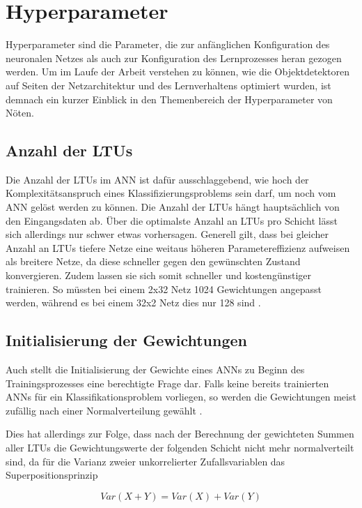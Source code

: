 \section{Hyperparameter} \label{hyperparam}

Hyperparameter sind die Parameter, die zur anfänglichen Konfiguration des neuronalen Netzes als auch zur Konfiguration des Lernprozesses heran gezogen werden. Um im Laufe der Arbeit verstehen zu können, wie die Objektdetektoren auf Seiten der Netzarchitektur und des Lernverhaltens optimiert wurden, ist demnach ein kurzer Einblick in den Themenbereich der Hyperparameter von Nöten.

\subsection*{Anzahl der LTUs}
Die Anzahl der LTUs im ANN ist dafür ausschlaggebend, wie hoch der Komplexitätsanspruch eines Klassifizierungsproblems sein darf, um noch vom ANN gelöst werden zu können. Die Anzahl der LTUs hängt hauptsächlich von den Eingangsdaten ab. Über die optimalste Anzahl an LTUs pro Schicht lässt sich allerdings nur schwer etwas vorhersagen. Generell gilt, dass bei gleicher Anzahl an LTUs tiefere Netze eine weitaus höheren Parametereffizienz aufweisen als breitere Netze, da diese schneller gegen den gewünschten Zustand konvergieren. Zudem lassen sie sich somit schneller und kostengünstiger trainieren. So müssten bei einem 2x32 Netz 1024 Gewichtungen angepasst werden, während es bei einem 32x2 Netz dies nur 128 sind \cite{AurelienGeron.2018}.

\subsection*{Initialisierung der Gewichtungen}
Auch stellt die Initialisierung der Gewichte eines ANNs zu Beginn des Trainingsprozesses eine berechtigte Frage dar. Falls keine bereits trainierten ANNs für ein Klassifikationsproblem vorliegen, so werden die Gewichtungen meist zufällig nach einer Normalverteilung gewählt \cite{AurelienGeron.2018}. 

Dies hat allerdings zur Folge, dass nach der Berechnung der gewichteten Summen aller LTUs die Gewichtungswerte der folgenden Schicht nicht mehr normalverteilt sind, da für die Varianz zweier unkorrelierter Zufallsvariablen das Superpositionsprinzip

\begin{equation} \label{varianz}
Var(X + Y) = Var(X) + Var(Y)
\end{equation}

